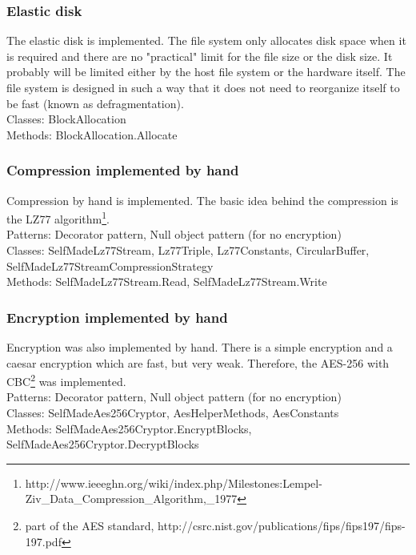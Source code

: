 \documentclass[JCDReport.tex]{subfiles}
\begin{document}
\subsubsection{Elastic disk}
The elastic disk is implemented. The file system only allocates disk space when it is required and there are no "practical" limit for the file size or the disk size. It probably will be limited either by the host file system or the hardware itself. The file system is designed in such a way that it does not need to reorganize itself to be fast (known as defragmentation).\\
Classes: BlockAllocation\\
Methods: BlockAllocation.Allocate

\subsubsection{Compression implemented by hand}
Compression by hand is implemented. The basic idea behind the compression is the LZ77 algorithm\footnote{http://www.ieeeghn.org/wiki/index.php/Milestones:Lempel-Ziv\_Data\_Compression\_Algorithm,\_1977}.\\
Patterns: Decorator pattern, Null object pattern (for no encryption)\\
Classes: SelfMadeLz77Stream, Lz77Triple, Lz77Constants, CircularBuffer, SelfMadeLz77StreamCompressionStrategy\\
Methods: SelfMadeLz77Stream.Read, SelfMadeLz77Stream.Write

\subsubsection{Encryption implemented by hand}
Encryption was also implemented by hand. There is a simple encryption and a caesar encryption which are fast, but very weak. Therefore, the AES-256 with CBC\footnote{part of the AES standard, http://csrc.nist.gov/publications/fips/fips197/fips-197.pdf} was implemented.\\
Patterns: Decorator pattern, Null object pattern (for no encryption)\\
Classes: SelfMadeAes256Cryptor, AesHelperMethods, AesConstants\\
Methods: SelfMadeAes256Cryptor.EncryptBlocks, SelfMadeAes256Cryptor.DecryptBlocks
\end{document}
